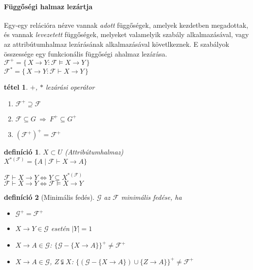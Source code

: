 \documentclass[fleqn,10pt,a4paper]{article}
\newcommand{\nn}{\Rightarrow}
\newcommand{\F}{\mathcal{F}}
\newcommand{\listazjromai}{
  \renewcommand{\theenumi}{\roman{enumi}}
  \renewcommand{\labelenumi}{(\theenumi)}
}
\newenvironment{enumzjromai}{\listazjromai\begin{enumerate}}{\end{enumerate}}
\newenvironment{enumzjr}{\begin{enumzjromai}}{\end{enumzjromai}}
\theoremstyle{magyar}
\newtheorem{de}{definíció}[section]
\newtheorem{te}{tétel}[section]
\begin{document}
  \paragraph{Függőségi halmaz lezártja} Egy-egy relációra nézve vannak \emph{adott} függőségek, amelyek kezdetben
  megadottak, és vannak \emph{levezetett} függőségek, melyeket valamelyik szabály alkalmazásával, vagy az
  attribútumhalmaz lezárásának alkalmazásával követlkeznek. E szabályok összessége egy funkcionális függőségi ahalmaz lezárása.\\


  \noindent $\F^+ = \{\,X\to Y : \F \models X\to Y\,\}$\\
  $\F^* = \{\,X\to Y : \F \vdash X\to Y\,\}$

  \begin{te} $+$, $*$ lezárási operátor
    \begin{enumzjr}
    \item $\F^+\supseteq \F$
    \item $\F\subseteq G\ \nn \ F^+ \subseteq G^+$
    \item $(\F^+)^+ = \F^+$
    \end{enumzjr}
  \end{te}
  

  \begin{de} $X \subset U$ (Attribútumhalmaz)\\
    $ X^{*(\F)} = \{ A \mid \F \vdash X\to A \}$
  \end{de}
  
  \noindent $\F \vdash X\to Y\iff Y\subseteq X^{*(\F)}$\\
  $\F\vdash X\to Y\iff \F\models X\to Y$


  \begin{de}[Minimális fedés]
    $\mathcal G$ az $\F$ minimális fedése, ha
    \begin{itemize}
    \item $\mathcal{G}^+ = \F^+$
    \item $X\to Y \in \mathcal{G}$ esetén $|Y| = 1$
    \item $X\to A \in \mathcal{G}$: $\{\mathcal{G}-\{X\to A\}\}^+ \neq \F^+$
    \item $X\to A \in \mathcal{G}$, $Z\subsetneqq X$: $\{(\mathcal{G}-\{X\to A\})\cup \{Z\to A\}\}^+ \neq \F^+$
    \end{itemize}
  \end{de}
\end{document}
